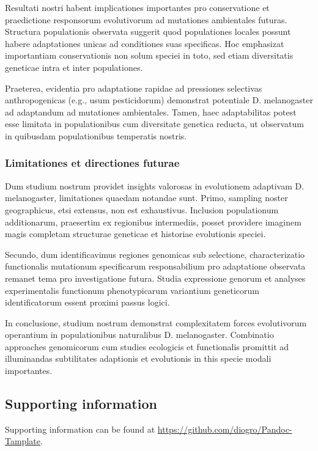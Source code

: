 \documentclass[
]{article}
\begin{document}
Resultati nostri habent implicationes importantes pro conservatione et
praedictione responsorum evolutivorum ad mutationes ambientales futuras.
Structura populationis observata suggerit quod populationes locales
possunt habere adaptationes unicas ad conditiones suas specificas. Hoc
emphasizat importantiam conservationis non solum speciei in toto, sed
etiam diversitatis geneticae intra et inter populationes.

Praeterea, evidentia pro adaptatione rapidae ad pressiones selectivas
anthropogenicas (e.g., usum pesticidorum) demonstrat potentiale D.
melanogaster ad adaptandum ad mutationes ambientales. Tamen, haec
adaptabilitas potest esse limitata in populationibus cum diversitate
genetica reducta, ut observatum in quibusdam populationibus temperatis
nostris.

\subsubsection{Limitationes et directiones
futurae}\label{limitationes-et-directiones-futurae}

Dum studium nostrum providet insights valorosas in evolutionem adaptivam
D. melanogaster, limitationes quaedam notandae sunt. Primo, sampling
noster geographicus, etsi extensus, non est exhaustivus. Inclusion
populationum additionarum, praesertim ex regionibus intermediis, posset
providere imaginem magis completam structurae geneticae et historiae
evolutionis speciei.

Secundo, dum identificavimus regiones genomicas sub selectione,
characterizatio functionalis mutationum specificarum responsabilium pro
adaptatione observata remanet tema pro investigatione futura. Studia
expressione genorum et analyses experimentalis functionum phenotypicarum
variantium geneticorum identificatorum essent proximi passus logici.

In conclusione, studium nostrum demonstrat complexitatem forces
evolutivorum operantium in populationibus naturalibus D. melanogaster.
Combinatio approaches genomicorum cum studies ecologicis et functionalis
promittit ad illuminandas subtilitates adaptionis et evolutionis in this
specie modali importantes.

\subsection{Supporting information}\label{supporting-information}

Supporting information can be found at
\url{https://github.com/diogro/Pandoc-Tamplate}.
\end{document}
